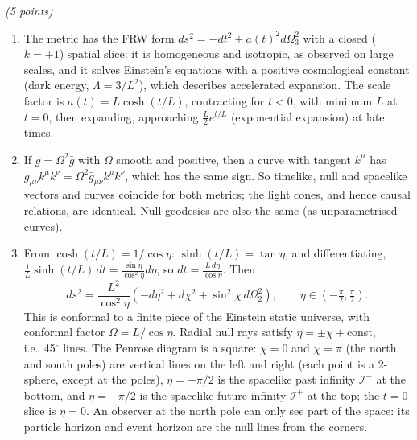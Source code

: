 \documentclass[12pt]{article}
\newcommand{\be}{\begin{equation}}
\newcommand{\ee}{\end{equation}}
\newcounter{quesno}
\newcommand{\ques}[1]{\vspace{2em}\stepcounter{quesno}
\noindent{\bf Question \thequesno.} \emph{(#1 points)}\\
}
\begin{document}
\ques{5}
\begin{enumerate}[label=\alph*)]
\item The metric has the FRW form $ds^2=-dt^2+a(t)^2d\Omega_3^2$ with a closed ($k=+1$) spatial slice: it is homogeneous and isotropic, as observed on large scales, and it solves Einstein's equations with a positive cosmological constant (dark energy, $\Lambda=3/L^2$), which describes accelerated expansion. The scale factor is $a(t)=L\cosh(t/L)$, contracting for $t<0$, with minimum $L$ at $t=0$, then expanding, approaching $\tfrac L2e^{t/L}$ (exponential expansion) at late times.
\item If $g=\Omega^2\bar g$ with $\Omega$ smooth and positive, then a curve with tangent $k^\mu$ has $g_{\mu\nu}k^\mu k^\nu=\Omega^2\bar g_{\mu\nu}k^\mu k^\nu$, which has the same sign. So timelike, null and spacelike vectors and curves coincide for both metrics; the light cones, and hence causal relations, are identical. Null geodesics are also the same (as unparametrised curves).
\item From $\cosh(t/L)=1/\cos\eta$: $\sinh(t/L)=\tan\eta$, and differentiating, $\frac1L\sinh(t/L)\,dt=\frac{\sin\eta}{\cos^2\eta}d\eta$, so $dt=\frac{L\,d\eta}{\cos\eta}$. Then
\be
ds^2=\frac{L^2}{\cos^2\eta}\left(-d\eta^2+d\chi^2+\sin^2\chi\,d\Omega_2^2\right),\qquad \eta\in(-\tfrac\pi2,\tfrac\pi2).
\ee
This is conformal to a finite piece of the Einstein static universe, with conformal factor $\Omega=L/\cos\eta$. Radial null rays satisfy $\eta=\pm\chi+$const, i.e.\ 45$^\circ$ lines. The Penrose diagram is a square: $\chi=0$ and $\chi=\pi$ (the north and south poles) are vertical lines on the left and right (each point is a 2-sphere, except at the poles), $\eta=-\pi/2$ is the spacelike past infinity $\mathscr I^-$ at the bottom, and $\eta=+\pi/2$ is the spacelike future infinity $\mathscr I^+$ at the top; the $t=0$ slice is $\eta=0$. An observer at the north pole can only see part of the space: its particle horizon and event horizon are the null lines from the corners.
\begin{center}
\end{center}
\end{enumerate}
\end{document}
